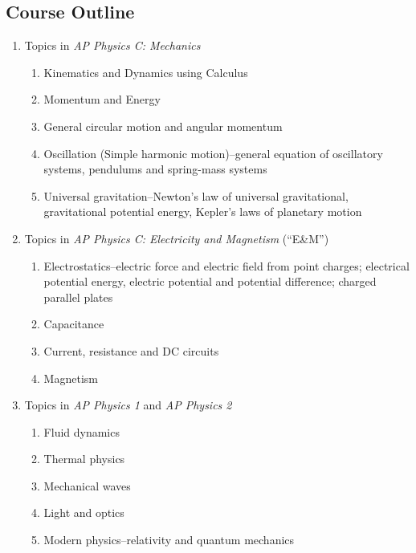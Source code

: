 \documentclass[11pt]{article}
\begin{document}
\subsection*{Course Outline}
\begin{enumerate}[itemsep=.1ex]
\item Topics in \emph{AP Physics C: Mechanics}
  \begin{enumerate}[itemsep=0pt,leftmargin=18pt]
  \item Kinematics and Dynamics using Calculus
  \item Momentum and Energy
  \item General circular motion and angular momentum
  \item Oscillation (Simple harmonic motion)--general equation of oscillatory
    systems, pendulums and spring-mass systems
  \item Universal gravitation--Newton's law of universal gravitational,
    gravitational potential energy, Kepler's laws of planetary motion
  \end{enumerate}
\item Topics in \emph{AP Physics C: Electricity and Magnetism} (``E\&M'')
  \begin{enumerate}[itemsep=0pt,leftmargin=18pt]
  \item Electrostatics--electric force and electric field from point charges;
    electrical potential energy, electric potential and potential difference;
    charged parallel plates
  \item Capacitance
  \item Current, resistance and DC circuits
  \item Magnetism
  \end{enumerate}
\item Topics in \emph{AP Physics 1} and \emph{AP Physics 2}
  \begin{enumerate}[itemsep=0pt,leftmargin=18pt]
  \item Fluid dynamics
  \item Thermal physics
  \item Mechanical waves
  \item Light and optics
  \item Modern physics--relativity and quantum mechanics
  \end{enumerate}
\end{enumerate}
\end{document}
